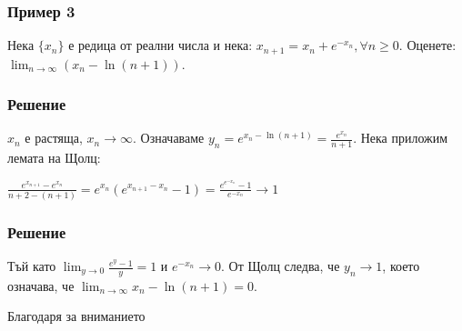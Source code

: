 \documentclass[12pt]{beamer}
\begin{document}
\begin{frame}
\frametitle{Пример 3}
\begin{block}
{}
\begin{center}
Нека \(\{x_n\}\) е редица от реални числа и нека:
\(x_{n + 1} = x_n + e^{-x_n}, \forall n \geq 0.\)
\newline
Оценете: \(\displaystyle\lim_{n\to\infty} (x_n - \ln(n+1))\).
\end{center}
\end{block}
\end{frame}

\begin{frame}
\frametitle{Решение}
\begin{block}
{}
\(x_n\) е растяща, \(x_n \to \infty\).
Означаваме \(\displaystyle y_n=e^{x_n-\ln(n+1)}=\frac{e^{x_n}}{n+1}\).
Нека приложим лемата на Щолц:
\begin{center}
\(\displaystyle\frac{e^{x_{n+1}}-e^{x_n}}{n+2-(n+1)}=e^{x_n}(e^{x_{n+1}-x_n}-1)=\frac{e^{e^{-x_n}}-1}{e^{-x_n}}\to 1\)
\end{center}
\end{block}
\end{frame}

\begin{frame}
\frametitle{Решение}
\begin{block}
{}
Тъй като \(\displaystyle \lim_{y\to 0}\frac{e^y-1}{y}=1\) и \(e^{-x_n}\to 0\).
\newline
От Щолц следва, че \(y_n \to 1\), което означава, че \(\displaystyle\lim_{n \to \infty}x_n-\ln(n+1)= 0\).
\end{block}
\end{frame}

\begin{frame}
\centerline{Благодаря за вниманието}
\end{frame}
\end{document}
